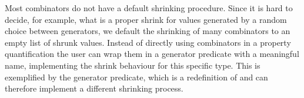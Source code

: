 Most combinators do not have a default shrinking procedure.
%
Since it is hard to decide, for example, what is a proper shrink for
values generated by a random choice between generators, we default
the shrinking of many combinators to an empty list of shrunk values.
%
Instead of directly using combinators in a property quantification
the user can wrap them in a generator predicate with a meaningful name,
implementing the shrink behaviour for this specific type.
%
This is exemplified by the  generator predicate, which is a
redefinition of  and can therefore implement a different
shrinking process.
